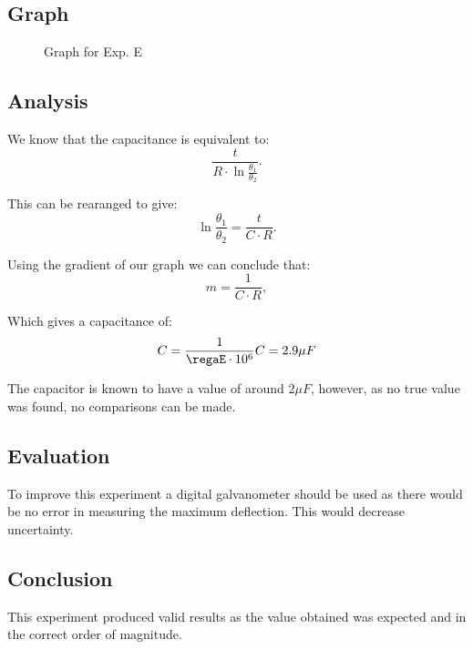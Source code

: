 \subsection{Graph}

\begin{figure}[H]
  \centering
  \caption{Graph for Exp. E}
\end{figure}

\subsection{Analysis}
We know that the capacitance is equivalent to:
\begin{equation*}
  \frac{t}{R \cdot \ln{\frac{\theta_1}{\theta_2}}}.
\end{equation*}

This can be rearanged to give:
\begin{equation*}
  \ln{\frac{\theta_1}{\theta_2}} = \frac{t}{C \cdot R}.
\end{equation*}

Using the gradient of our graph we can conclude that:
\begin{equation*}
  m = \frac{1}{C \cdot R},
\end{equation*}

Which gives a capacitance of:
\begin{equation*}
  C = \frac{1}{\regaE \cdot 10^6} \\
  C = 2.9 \mu F
\end{equation*}

The capacitor is known to have a value of around $2\mu F$, however, as no true value was found, no comparisons can be made.

\subsection{Evaluation}
To improve this experiment a digital galvanometer should be used as there would be no error in measuring the maximum deflection.
This would decrease uncertainty.

\subsection{Conclusion}
This experiment produced valid results as the value obtained was expected and in the correct order of magnitude.
